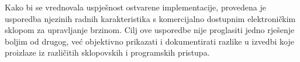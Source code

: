 \documentclass[diplomskirad]{fer}
\begin{document}
Kako bi se vrednovala uspješnost ostvarene implementacije, provedena je
usporedba njezinih radnih karakteristika s komercijalno dostupnim elektroničkim
sklopom za upravljanje brzinom. Cilj ove usporedbe nije proglasiti jedno
rješenje boljim od drugog, već objektivno prikazati i dokumentirati razlike u
izvedbi koje proizlaze iz različitih sklopovskih i programskih pristupa.

%
%
%
%
%
%
%
\end{document}
